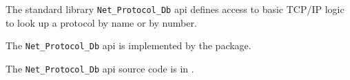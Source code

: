 
The standard library {\tt Net\_Protocol\_Db} api defines access to basic {\sc TCP/IP} logic to 
look up a protocol by name or by number.

The {\tt Net\_Protocol\_Db} api is implemented by the  package.

The {\tt Net\_Protocol\_Db} api source code is in .
